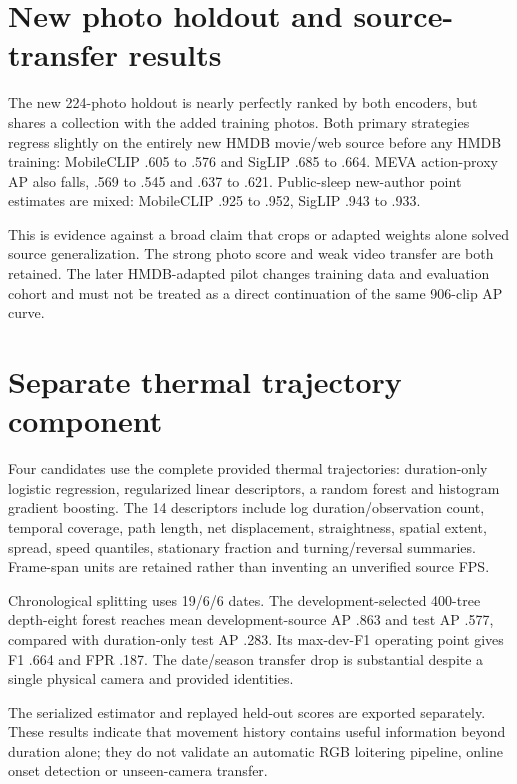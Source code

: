 \section{New photo holdout and source-transfer results}

The new 224-photo holdout is nearly perfectly ranked by both encoders, but shares a collection with the added training photos. Both primary strategies regress slightly on the entirely new HMDB movie/web source before any HMDB training: MobileCLIP .605 to .576 and SigLIP .685 to .664. MEVA action-proxy AP also falls, .569 to .545 and .637 to .621. Public-sleep new-author point estimates are mixed: MobileCLIP .925 to .952, SigLIP .943 to .933.

This is evidence against a broad claim that crops or adapted weights alone solved source generalization. The strong photo score and weak video transfer are both retained. The later HMDB-adapted pilot changes training data and evaluation cohort and must not be treated as a direct continuation of the same 906-clip AP curve.

\section{Separate thermal trajectory component}
Four candidates use the complete provided thermal trajectories: duration-only logistic regression, regularized linear descriptors, a random forest and histogram gradient boosting. The 14 descriptors include log duration/observation count, temporal coverage, path length, net displacement, straightness, spatial extent, spread, speed quantiles, stationary fraction and turning/reversal summaries. Frame-span units are retained rather than inventing an unverified source FPS.

Chronological splitting uses 19/6/6 dates. The development-selected 400-tree depth-eight forest reaches mean development-source AP .863 and test AP .577, compared with duration-only test AP .283. Its max-dev-F1 operating point gives F1 .664 and FPR .187. The date/season transfer drop is substantial despite a single physical camera and provided identities.

The serialized estimator and replayed held-out scores are exported separately. These results indicate that movement history contains useful information beyond duration alone; they do not validate an automatic RGB loitering pipeline, online onset detection or unseen-camera transfer.

